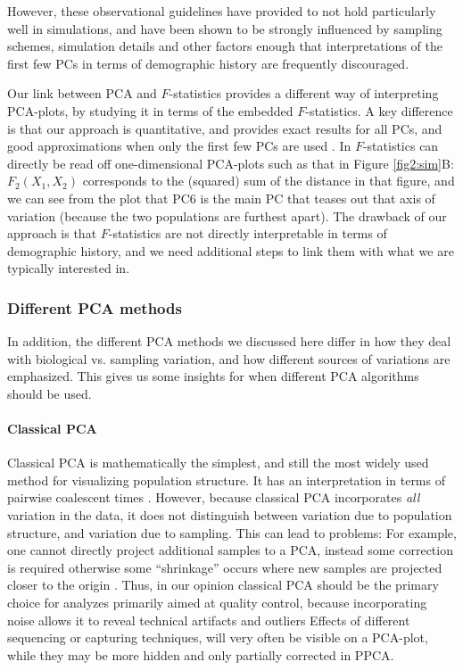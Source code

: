 \documentclass[12pt, letterpaper]{article}
\begin{document}
However, these observational guidelines have provided to not hold particularly well in simulations, and have been shown to be strongly influenced by sampling schemes, simulation details and other factors \citep{novembre_interpreting_2008, degiorgio_geographic_2013, elhaik_principal_2022, jay_anisotropic_2013} enough that interpretations of the first few PCs in terms of demographic history are frequently discouraged.

Our link between PCA and $F$-statistics provides a different way of interpreting PCA-plots, by studying it in terms of the embedded $F$-statistics. A key difference is that our approach is quantitative, and provides exact results for all PCs, and good approximations when only the first few PCs are used \cite{peter_geometric_2022}. In $F$-statistics can directly be read off one-dimensional PCA-plots such as that in Figure \ref{fig2:sim}B: $F_2(X_1, X_2)$ corresponds to the (squared) sum of the distance in that figure, and we can see from the plot that PC6 is the main PC that teases out that axis of variation (because the two populations are furthest apart).  
The drawback of our approach is that $F$-statistics are not directly interpretable in terms of demographic history, and we need additional steps to link them with what we are typically interested in. 

\subsubsection{Different PCA methods}
In addition, the different PCA methods we discussed here differ in how they deal with biological vs. sampling variation, and how different sources of variations are emphasized. This gives us some insights for when different PCA algorithms should be used. 

\paragraph{Classical PCA}
Classical PCA is mathematically the simplest, and still the most widely used method for visualizing population structure. It has an interpretation in terms of pairwise coalescent times \citep{mcvean_genealogical_2009}. However, because classical PCA incorporates \emph{all} variation in the data, it does not distinguish between variation due to population structure, and variation due to sampling. This can lead to problems: For example, one cannot directly project additional samples to a PCA, instead some correction is required otherwise some ``shrinkage'' occurs where new samples are projected closer to the origin \citep{patterson_population_2006, wang_improved_2015}.  Thus, in our opinion classical PCA should be the primary choice for analyzes primarily aimed at quality control, because incorporating noise allows it to reveal technical artifacts and outliers Effects of different sequencing or capturing techniques, will very often be visible on a PCA-plot, while they may be more hidden and only partially corrected in PPCA.
\end{document}
